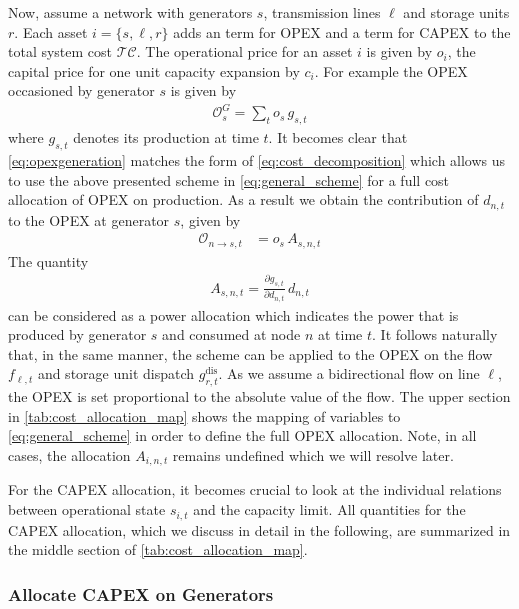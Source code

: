 \documentclass[11pt,twocolumn]{article}
\newcommand{\pdv}[2]{\frac{\partial #1}{\partial #2}}
\newcommand{\state}{s_{i,t}}
\newcommand{\generation}{g_{s,t}}
\newcommand{\operationalpricegeneration}{o_{s}}
\newcommand{\flow}{f_{\ell,t}}
\newcommand{\storage}{g_{r,t}}
\newcommand{\storagedispatch}{\storage^\text{dis}}
\newcommand{\demand}[1][n]{d_{#1,t}}
\newcommand{\allocategeneration}[1][s, n]{A_{#1,t}}
\newcommand{\allocatestate}[1][i, n]{A_{#1,t}}
\newcommand{\allocateopex}[1][n \rightarrow s]{\mathcal{O}_{#1,t}}
\newcommand{\totalcost}{\mathcal{TC}}
\newcommand{\opexgeneration}{\mathcal{O}^G}
\begin{document}
Now, assume a network with generators $s$, transmission lines $\ell$ and storage units $r$. Each asset $i = \{s, \ell, r\}$ adds an term for OPEX and a term for CAPEX to the total system cost $\totalcost$. The operational price for an asset $i$ is given by $o_i$, the capital price for one unit capacity expansion by $c_i$. For example the OPEX occasioned by generator $s$ is given by 
\begin{align}
    \opexgeneration_s = \sum_t \operationalpricegeneration \, \generation 
    \label{eq:opexgeneration}
\end{align}
where $\generation$ denotes its production at time $t$. It becomes clear that \cref{eq:opexgeneration} matches the form of \cref{eq:cost_decomposition} which allows us to use the above presented scheme in \cref{eq:general_scheme} for a full cost allocation of OPEX on production. As a result we obtain the contribution of $\demand$ to the OPEX at generator $s$, given by 
\begin{align}
    \allocateopex[n \rightarrow s] &= 
   \operationalpricegeneration \,  \allocategeneration
\label{eq:allocate_opexGeneration_detailed}
\end{align}
The quantity  
\begin{align}
 \allocategeneration = \pdv{\generation}{\demand} \, \demand
 \label{eq:allocate_peer}
\end{align}
can be considered as a power allocation which indicates the power that is produced by generator $s$ and consumed at node $n$ at time $t$.
It follows naturally that, in the same manner, the scheme can be applied to the OPEX on the flow $\flow$ and storage unit dispatch $\storagedispatch$. As we assume a bidirectional flow on line $\ell$, the OPEX is set proportional to the absolute value of the flow. The upper section in \cref{tab:cost_allocation_map} shows the mapping of variables to \cref{eq:general_scheme} in order to define the full OPEX allocation. Note, in all cases, the allocation $\allocatestate$ remains undefined which we will resolve later.



For the CAPEX allocation, it becomes crucial to look at the individual relations between operational state $\state$ and the capacity limit. All quantities for the CAPEX allocation, which we discuss in detail in the following, are summarized in the middle section of \cref{tab:cost_allocation_map}.  

\subsubsection*{Allocate CAPEX on Generators}
\end{document}
